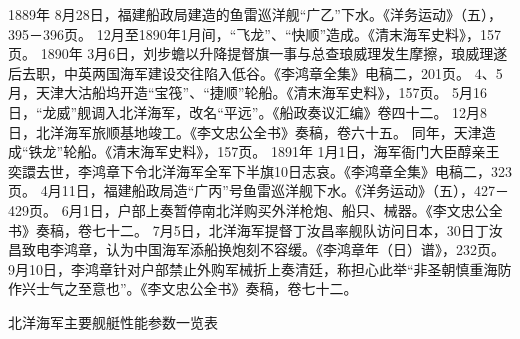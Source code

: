 \documentclass[12pt,UTF8]{ctexbook}
\begin{document}
1889年
8月28日，福建船政局建造的鱼雷巡洋舰“广乙”下水。《洋务运动》（五），395－396页。
12月至1890年1月间，“飞龙”、“快顺”造成。《清末海军史料》，157页。
1890年
3月6日，刘步蟾以升降提督旗一事与总查琅威理发生摩擦，琅威理遂后去职，中英两国海军建设交往陷入低谷。《李鸿章全集》电稿二，201页。
4、5月，天津大沽船坞开造“宝筏”、“捷顺”轮船。《清末海军史料》，157页。
5月16日，“龙威”舰调入北洋海军，改名“平远”。《船政奏议汇编》卷四十二。
12月8日，北洋海军旅顺基地竣工。《李文忠公全书》奏稿，卷六十五。
同年，天津造成“铁龙”轮船。《清末海军史料》，157页。
1891年
1月1日，海军衙门大臣醇亲王奕譞去世，李鸿章下令北洋海军全军下半旗10日志哀。《李鸿章全集》电稿二，323页。
4月11日，福建船政局造“广丙”号鱼雷巡洋舰下水。《洋务运动》（五），427－429页。
6月1日，户部上奏暂停南北洋购买外洋枪炮、船只、械器。《李文忠公全书》奏稿，卷七十二。
7月5日，北洋海军提督丁汝昌率舰队访问日本，30日丁汝昌致电李鸿章，认为中国海军添船换炮刻不容缓。《李鸿章年（日）谱》，232页。
9月10日，李鸿章针对户部禁止外购军械折上奏清廷，称担心此举“非圣朝慎重海防作兴士气之至意也”。《李文忠公全书》奏稿，卷七十二。




北洋海军主要舰艇性能参数一览表
\end{document}
